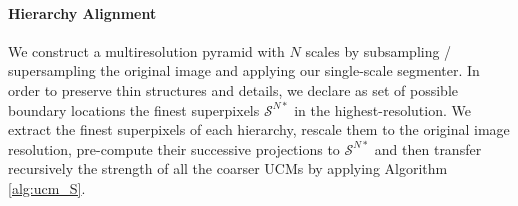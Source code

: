 \documentclass[10pt,journal,cspaper,compsoc]{IEEEtran}
\begin{document}

\paragraph*{\textbf{Hierarchy Alignment}}
We construct a multiresolution pyramid with $N$ scales by subsampling / supersampling the original image and applying our single-scale segmenter. 
In order to preserve thin structures and details, we declare as set of possible boundary locations the finest superpixels $\mathcal{S}^{N*}$ in the highest-resolution. 
We extract the finest superpixels of each hierarchy, rescale them to the original image resolution, pre-compute their successive projections to $\mathcal{S}^{N*}$ and then transfer recursively the strength of all the coarser UCMs by applying Algorithm \ref{alg:ucm_S}.
\end{document}
